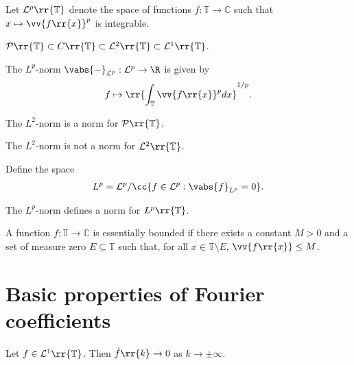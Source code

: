 \documentclass{article}
\begin{document}
\begin{definition}
  Let $\mathcal L^p\rr{\mathbb T}$ denote the space of functions
  $f:\mathbb T\to\mathbb C$ such that $x\mapsto\vv{f\rr{x}}^p$ is integrable.
\end{definition}

\begin{lemma}
  $\mathcal P\rr{\mathbb T}\subset C\rr{\mathbb T}\subset \mathcal L^2\rr{\mathbb T}\subset\mathcal L^1\rr{\mathbb T}$.
\end{lemma}

\begin{definition}
  The $L^p$-norm $\vabs{-}_{\mathcal L^p}:\mathcal L^p\to\R$ is given by
  \begin{align*}
    f \mapsto \rr{\int_{\mathbb T} \vv{f\rr{x}}^p dx}^{1/p}.
  \end{align*}
\end{definition}

\begin{theorem}
  The $L^2$-norm is a norm for $\mathcal P\rr{\mathbb T}$.
\end{theorem}

\begin{theorem}
  The $L^2$-norm is not a norm for $\mathcal L^2\rr{\mathbb T}$.
\end{theorem}

\begin{definition}
  Define the space
  \begin{align*}
    L^p = \mathcal L^p / \cc{f\in\mathcal L^p : \vabs{f}_{L^p} = 0}.
  \end{align*}
\end{definition}

\begin{theorem}
  The $L^p$-norm defines a norm for $L^p\rr{\mathbb T}$.
\end{theorem}

\begin{definition}
  A function $f:\mathbb T\to\mathbb C$ is essentially bounded if there exists a constant
  $M>0$ and a set of measure zero $E\subseteq\mathbb T$ such that, for all
  $x\in\mathbb T\setminus E$, $\vv{f\rr{x}}\leq M$.
\end{definition}

\section{Basic properties of Fourier coefficients}

\begin{lemma}
  Let $f\in\mathcal L^1\rr{\mathbb T}$. Then $\hat f\rr{k}\to 0$ as $k\to \pm\infty$.
\end{lemma}
\end{document}
